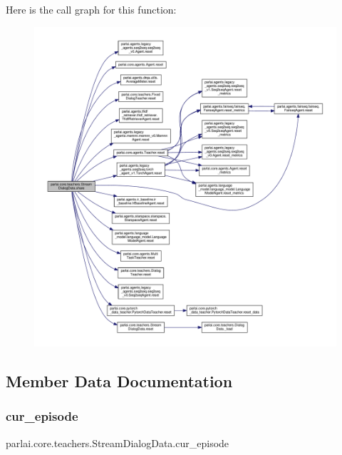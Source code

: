 Here is the call graph for this function\+:
\nopagebreak
\begin{figure}[H]
\begin{center}
\leavevmode
\includegraphics[width=350pt]{classparlai_1_1core_1_1teachers_1_1StreamDialogData_a6bb0ef8ed4a3360184f715e8fab9b3aa_cgraph}
\end{center}
\end{figure}


\subsection{Member Data Documentation}
\mbox{\label{classparlai_1_1core_1_1teachers_1_1StreamDialogData_ae045cda37bbe4fd67fdca7f902de8862}} 
\subsubsection{\texorpdfstring{cur\+\_\+episode}{cur\_episode}}
{\footnotesize\ttfamily parlai.\+core.\+teachers.\+Stream\+Dialog\+Data.\+cur\+\_\+episode}



